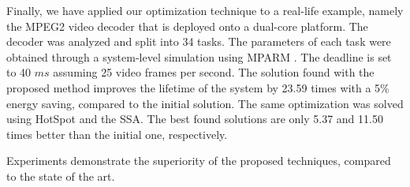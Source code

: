 Finally, we have applied our optimization technique to a real-life example,
namely the MPEG2 video decoder \cite{ffmpeg2011} that is deployed onto a
dual-core platform. The decoder was analyzed and split into 34 tasks. The
parameters of each task were obtained through a system-level simulation using
MPARM \cite{benini2005}. The deadline is set to 40 $ms$ assuming 25 video frames
per second. The solution found with the proposed method improves the lifetime of
the system by 23.59 times with a 5\% energy saving, compared to the initial
solution. The same optimization was solved using HotSpot and the SSA. The best
found solutions are only 5.37 and 11.50 times better than the initial one,
respectively.

Experiments demonstrate the superiority of the proposed techniques, compared to
the state of the art.

